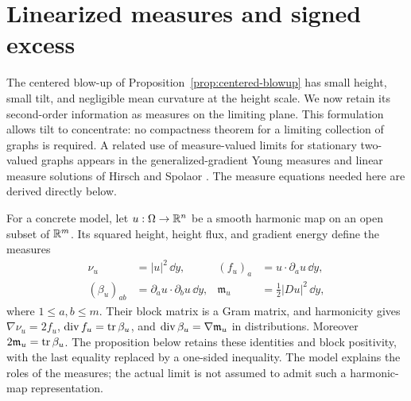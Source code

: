 \section{Linearized measures and signed excess}\label{sec:linearized}

The centered blow-up of Proposition~\ref{prop:centered-blowup} has small
height, small tilt, and negligible mean curvature at the height scale.
We now retain its second-order information as measures on the limiting
plane. This formulation allows tilt to concentrate: no compactness theorem
for a limiting collection of graphs is required.
A related use of measure-valued limits for stationary two-valued graphs
appears in the generalized-gradient Young measures and linear measure
solutions of Hirsch and Spolaor \cite[Sections~2--3]{HSgraphs}.
The measure equations needed here are derived directly below.

For a concrete model, let $u:\Omega\to\mathbb R^n$ be a smooth harmonic
map on an open subset of $\mathbb R^m$. Its squared height, height flux,
and gradient energy define the measures
\[
 \begin{aligned}
 \nu_u&=|u|^2\,\dd y,
 & (f_u)_a&=u\cdot\partial_a u\,\dd y,\\
 (\beta_u)_{ab}&=\partial_a u\cdot\partial_b u\,\dd y,
 & \mathfrak m_u&=\tfrac12|Du|^2\,\dd y,
 \end{aligned}
\]
where $1\le a,b\le m$. Their block matrix is a Gram matrix, and
harmonicity gives
$\nabla\nu_u=2f_u$, $\operatorname{div} f_u=\operatorname{tr}\beta_u$, and
$\operatorname{div}\beta_u=\nabla\mathfrak m_u$ in distributions.
Moreover $2\mathfrak m_u=\operatorname{tr}\beta_u$.
The proposition below retains these identities and block positivity,
with the last equality replaced by a one-sided inequality. The model
explains the roles of the measures; the actual limit is not assumed
to admit such a harmonic-map representation.

